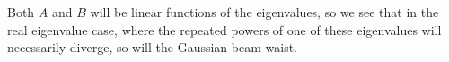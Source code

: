 {Both $A$ and $B$ will be linear functions of the eigenvalues, so we see that in the real eigenvalue case, where the repeated powers of one of these eigenvalues will necessarily diverge, so will the Gaussian beam waist.

%
%
%
%
%
%
%
%
%
%
%
%
%
%
%
%
}
